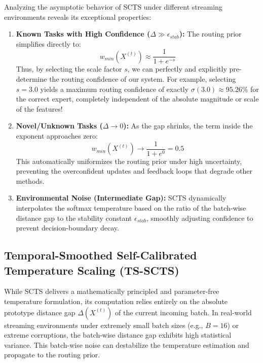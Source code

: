 \documentclass{article}
\theoremstyle{plain}
\theoremstyle{definition}
\theoremstyle{remark}
\begin{document}
Analyzing the asymptotic behavior of SCTS under different streaming environments reveals its exceptional properties:
\begin{enumerate}
  \item \textbf{Known Tasks with High Confidence ($\Delta \gg \epsilon_{stab}$):}
    The routing prior simplifies directly to:
    \begin{equation}
      w_{min}(X^{(t)}) \approx \frac{1}{1 + e^{-s}}
    \end{equation}
    Thus, by selecting the scale factor $s$, we can perfectly and explicitly pre-determine the routing confidence of our system. For example, selecting $s = 3.0$ yields a maximum routing confidence of exactly $\sigma(3.0) \approx 95.26\%$ for the correct expert, completely independent of the absolute magnitude or scale of the features!
  \item \textbf{Novel/Unknown Tasks ($\Delta \to 0$):}
    As the gap shrinks, the term inside the exponent approaches zero:
    \begin{equation}
      w_{min}(X^{(t)}) \to \frac{1}{1 + e^0} = 0.5
    \end{equation}
    This automatically uniformizes the routing prior under high uncertainty, preventing the overconfident updates and feedback loops that degrade other methods.
  \item \textbf{Environmental Noise (Intermediate Gap):}
    SCTS dynamically interpolates the softmax temperature based on the ratio of the batch-wise distance gap to the stability constant $\epsilon_{stab}$, smoothly adjusting confidence to prevent decision-boundary decay.
\end{enumerate}

\subsection{Temporal-Smoothed Self-Calibrated Temperature Scaling (TS-SCTS)}
While SCTS delivers a mathematically principled and parameter-free temperature formulation, its computation relies entirely on the absolute prototype distance gap $\Delta(X^{(t)})$ of the current incoming batch. In real-world streaming environments under extremely small batch sizes (e.g., $B=16$) or extreme corruptions, the batch-wise distance gap exhibits high statistical variance. This batch-wise noise can destabilize the temperature estimation and propagate to the routing prior.
\end{document}
